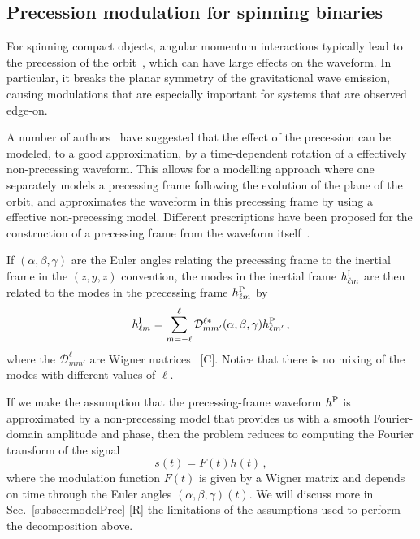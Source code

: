 \documentclass[aps,showpacs,twocolumn,
prd,superscriptaddress,nofootinbib]{revtex4-1}
\newcommand{\be}{\begin{equation}}
\newcommand{\ee}{\end{equation}}
\newcommand\calD{{\mathcal{D}}}
\newcommand{\SM}[1]{{\color{Red} #1}}
\newcommand{\jgb}[1]{{\color{DarkGreen} #1}}
\begin{document}

\subsection{Precession modulation for spinning binaries}
\label{subsec:modulationPrec}

For spinning compact objects, \jgb{angular momentum interactions typically} lead to the precession of the orbit~\cite{Apostolatos+94, Kidder95}, which can have large effects on the waveform. In particular, it breaks the planar symmetry of the gravitational wave emission, causing modulations that are especially important for systems that are observed edge-on.

A number of authors~\cite{BCV03b, BCPTV05, Schmidt+10, OShaughnessy+11, Boyle+11} have suggested that the effect of the precession can be modeled, to a good approximation, by a time-dependent rotation of a effectively non-precessing waveform. This allows for a modelling approach where one separately models a precessing frame following the evolution of the plane of the orbit, and approximates the waveform in this precessing frame by using a effective non-precessing model. Different prescriptions have been proposed for the construction of a precessing frame from the waveform itself~\cite{Schmidt+10, OShaughnessy+11, Boyle+11}.

If $(\alpha, \beta, \gamma)$ are the Euler angles relating the precessing frame to the inertial frame in the $(z,y,z)$ convention, the modes in the inertial frame $h_{\ell m}^{\rm I}$ are then related to the modes in the precessing frame $h_{\ell m}^{\rm P}$ by~\cite{Goldberg+67}
\be\label{eq:wignerrotintro}
	h_{\ell m}^{\rm I} = \sum\limits_{m=-\ell}^{\ell} \calD^{\ell *}_{mm'} (\alpha,\beta,\gamma) h_{\ell m'}^{\rm P} \,,
\ee
where the $\calD^{\ell}_{mm'}$ are Wigner matrices~\cite{} \SM{[C]}. Notice that there is no mixing of the modes with different values of $\ell$.

If we make the assumption that the precessing-frame waveform $h^{\rm P}$ is approximated by a non-precessing model that provides us with a smooth Fourier-domain amplitude and phase, then the problem reduces to computing the Fourier transform of the signal
\be\label{eq:defmodulationprec}
	s(t) = F(t) h(t) \,,
\ee
where the modulation function $F(t)$ is given by a Wigner matrix and depends on time through the Euler angles $(\alpha, \beta, \gamma)(t)$. We will discuss more in Sec.~\ref{subsec:modelPrec} \SM{[R]} the limitations of the assumptions used to perform the decomposition above.
\end{document}
